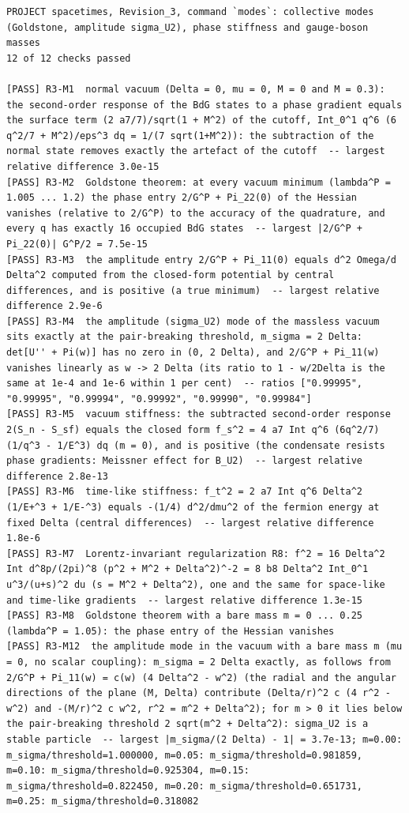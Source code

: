 \documentclass[
  10pt,
]{article}
\begin{document}
\begin{verbatim}
PROJECT spacetimes, Revision_3, command `modes`: collective modes (Goldstone, amplitude sigma_U2), phase stiffness and gauge-boson masses
12 of 12 checks passed

[PASS] R3-M1  normal vacuum (Delta = 0, mu = 0, M = 0 and M = 0.3): the second-order response of the BdG states to a phase gradient equals the surface term (2 a7/7)/sqrt(1 + M^2) of the cutoff, Int_0^1 q^6 (6 q^2/7 + M^2)/eps^3 dq = 1/(7 sqrt(1+M^2)): the subtraction of the normal state removes exactly the artefact of the cutoff  -- largest relative difference 3.0e-15
[PASS] R3-M2  Goldstone theorem: at every vacuum minimum (lambda^P = 1.005 ... 1.2) the phase entry 2/G^P + Pi_22(0) of the Hessian vanishes (relative to 2/G^P) to the accuracy of the quadrature, and every q has exactly 16 occupied BdG states  -- largest |2/G^P + Pi_22(0)| G^P/2 = 7.5e-15
[PASS] R3-M3  the amplitude entry 2/G^P + Pi_11(0) equals d^2 Omega/d Delta^2 computed from the closed-form potential by central differences, and is positive (a true minimum)  -- largest relative difference 2.9e-6
[PASS] R3-M4  the amplitude (sigma_U2) mode of the massless vacuum sits exactly at the pair-breaking threshold, m_sigma = 2 Delta: det[U'' + Pi(w)] has no zero in (0, 2 Delta), and 2/G^P + Pi_11(w) vanishes linearly as w -> 2 Delta (its ratio to 1 - w/2Delta is the same at 1e-4 and 1e-6 within 1 per cent)  -- ratios ["0.99995", "0.99995", "0.99994", "0.99992", "0.99990", "0.99984"]
[PASS] R3-M5  vacuum stiffness: the subtracted second-order response 2(S_n - S_sf) equals the closed form f_s^2 = 4 a7 Int q^6 (6q^2/7)(1/q^3 - 1/E^3) dq (m = 0), and is positive (the condensate resists phase gradients: Meissner effect for B_U2)  -- largest relative difference 2.8e-13
[PASS] R3-M6  time-like stiffness: f_t^2 = 2 a7 Int q^6 Delta^2 (1/E+^3 + 1/E-^3) equals -(1/4) d^2/dmu^2 of the fermion energy at fixed Delta (central differences)  -- largest relative difference 1.8e-6
[PASS] R3-M7  Lorentz-invariant regularization R8: f^2 = 16 Delta^2 Int d^8p/(2pi)^8 (p^2 + M^2 + Delta^2)^-2 = 8 b8 Delta^2 Int_0^1 u^3/(u+s)^2 du (s = M^2 + Delta^2), one and the same for space-like and time-like gradients  -- largest relative difference 1.3e-15
[PASS] R3-M8  Goldstone theorem with a bare mass m = 0 ... 0.25 (lambda^P = 1.05): the phase entry of the Hessian vanishes
[PASS] R3-M12  the amplitude mode in the vacuum with a bare mass m (mu = 0, no scalar coupling): m_sigma = 2 Delta exactly, as follows from 2/G^P + Pi_11(w) = c(w) (4 Delta^2 - w^2) (the radial and the angular directions of the plane (M, Delta) contribute (Delta/r)^2 c (4 r^2 - w^2) and -(M/r)^2 c w^2, r^2 = m^2 + Delta^2); for m > 0 it lies below the pair-breaking threshold 2 sqrt(m^2 + Delta^2): sigma_U2 is a stable particle  -- largest |m_sigma/(2 Delta) - 1| = 3.7e-13; m=0.00: m_sigma/threshold=1.000000, m=0.05: m_sigma/threshold=0.981859, m=0.10: m_sigma/threshold=0.925304, m=0.15: m_sigma/threshold=0.822450, m=0.20: m_sigma/threshold=0.651731, m=0.25: m_sigma/threshold=0.318082

\end{verbatim}
\end{document}
